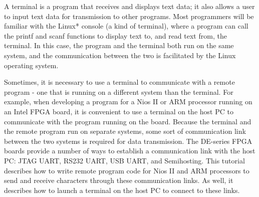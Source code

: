\documentclass[11pt, twoside, pdftex]{article}
\begin{document}
A terminal is a program that receives and displays text data; it also allows a user to input text data for transmission to other programs.
Most programmers will be familiar with the Linux* console (a kind of terminal), where a program can call the printf and scanf functions to display text to, and read text from, the terminal. In this case, the program and the terminal both run on the same system, and the communication between the two is facilitated by the Linux operating system. 



Sometimes, it is necessary to use a terminal to communicate with a remote program - one that is running on a different system than the terminal. For example, when developing a program for a Nios II or ARM processor running on an Intel FPGA board, it is convenient to use a terminal on the host PC to communicate with the program running on the board. Because the terminal and the remote program run on separate systems, some sort of communication link between the two systems is required for data transmission. The DE-series FPGA boards provide a number of ways to establish a communication link with the host PC: JTAG UART, RS232 UART, USB UART, and Semihosting. This tutorial describes how to write remote program code for Nios II and ARM processors to send and receive characters through these communication links. As well, it describes how to launch a terminal on the host PC to connect to these links.
\end{document}

